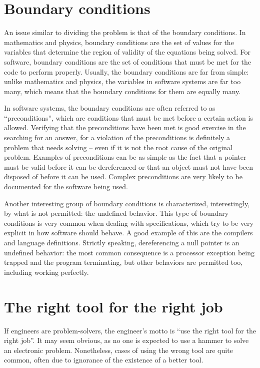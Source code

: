 \section*{Boundary conditions}

An issue similar to dividing the problem is that of the boundary conditions. In
mathematics and physics, boundary conditions are the set of values for the
variables that determine the region of validity of the equations being solved.
For software, boundary conditions are the set of conditions that must be met for
the code to perform properly. Usually, the boundary conditions are far from
simple: unlike mathematics and physics, the variables in software systems are
far too many, which means that the boundary conditions for them are equally
many.

In software systems, the boundary conditions are often referred to as
``preconditions'', which are conditions that must be met before a certain action
is allowed. Verifying that the preconditions have been met is good exercise in
the searching for an answer, for a violation of the preconditions is definitely
a problem that needs solving -- even if it is not the root cause of the original
problem. Examples of preconditions can be as simple as the fact that a pointer
must be valid before it can be dereferenced or that an object must not have been
disposed of before it can be used. Complex preconditions are very likely to be
documented for the software being used.

Another interesting group of boundary conditions is characterized,
interestingly, by what is not permitted: the undefined behavior. This type of
boundary conditions is very common when dealing with specifications, which try
to be very explicit in how software should behave. A good example of this are
the compilers and language definitions. Strictly speaking, dereferencing a null
pointer is an undefined behavior: the most common consequence is a processor
exception being trapped and the program terminating, but other behaviors are
permitted too, including working perfectly.

\section*{The right tool for the right job}

If engineers are problem-solvers, the engineer’s motto is ``use the right tool
for the right job''. It may seem obvious, as no one is expected to use a hammer
to solve an electronic problem. Nonetheless, cases of using the wrong tool are
quite common, often due to ignorance of the existence of a better tool.

